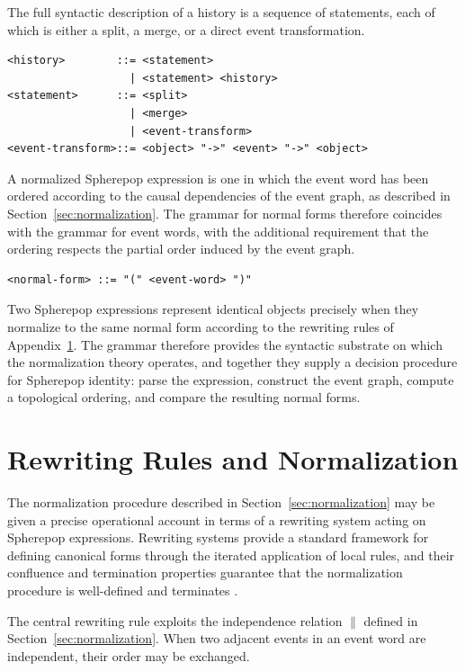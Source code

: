 \documentclass[12pt]{article}
\theoremstyle{plain}
\theoremstyle{definition}
\theoremstyle{remark}
\begin{document}
The full syntactic description of a history is a sequence of statements,
each of which is either a split, a merge, or a direct event transformation.

\begin{verbatim}
<history>        ::= <statement>
                   | <statement> <history>
<statement>      ::= <split>
                   | <merge>
                   | <event-transform>
<event-transform>::= <object> "->" <event> "->" <object>
\end{verbatim}

A normalized Spherepop expression is one in which the event word has been
ordered according to the causal dependencies of the event graph, as described
in Section~\ref{sec:normalization}.  The grammar for normal forms therefore
coincides with the grammar for event words, with the additional requirement
that the ordering respects the partial order induced by the event graph.

\begin{verbatim}
<normal-form> ::= "(" <event-word> ")"
\end{verbatim}

Two Spherepop expressions represent identical objects precisely when they
normalize to the same normal form according to the rewriting rules of
Appendix~\ref{app:rewriting}.  The grammar therefore provides the syntactic
substrate on which the normalization theory operates, and together they supply
a decision procedure for Spherepop identity: parse the expression, construct
the event graph, compute a topological ordering, and compare the resulting
normal forms.


\section{Rewriting Rules and Normalization}
\label{app:rewriting}

The normalization procedure described in Section~\ref{sec:normalization} may
be given a precise operational account in terms of a rewriting system acting
on Spherepop expressions.  Rewriting systems provide a standard framework for
defining canonical forms through the iterated application of local rules, and
their confluence and termination properties guarantee that the normalization
procedure is well-defined and terminates \citep{Abramsky1994}.

The central rewriting rule exploits the independence relation $\parallel$
defined in Section~\ref{sec:normalization}.  When two adjacent events in an
event word are independent, their order may be exchanged.
\end{document}
